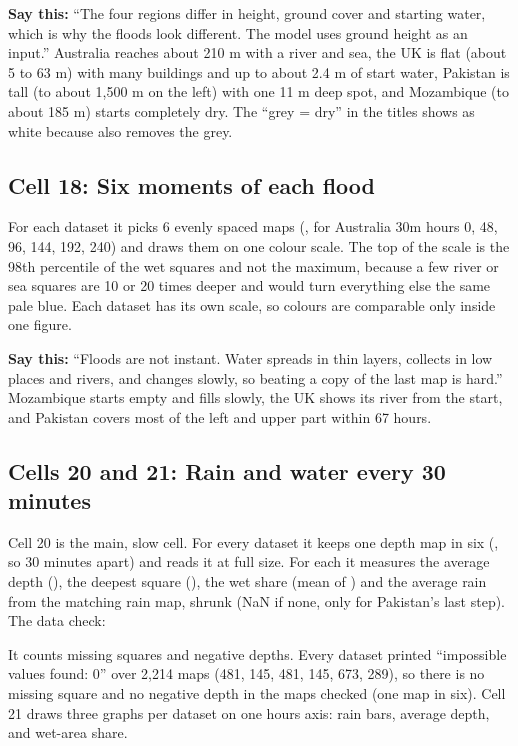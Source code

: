 \textbf{Say this:} ``The four regions differ in height, ground cover and starting water, which is why the floods look different. The model uses ground height as an input.'' Australia reaches about 210 m with a river and sea, the UK is flat (about 5 to 63 m) with many buildings and up to about 2.4 m of start water, Pakistan is tall (to about 1,500 m on the left) with one 11 m deep spot, and Mozambique (to about 185 m) starts completely dry. The ``grey = dry'' in the titles shows as white because  also removes the grey.

\subsection{Cell 18: Six moments of each flood}
For each dataset it picks 6 evenly spaced maps (, for Australia 30m hours 0, 48, 96, 144, 192, 240) and draws them on one colour scale. The top of the scale is the 98th percentile of the wet squares and not the maximum, because a few river or sea squares are 10 or 20 times deeper and would turn everything else the same pale blue. Each dataset has its own scale, so colours are comparable only inside one figure.

\textbf{Say this:} ``Floods are not instant. Water spreads in thin layers, collects in low places and rivers, and changes slowly, so beating a copy of the last map is hard.'' Mozambique starts empty and fills slowly, the UK shows its river from the start, and Pakistan covers most of the left and upper part within 67 hours.

\subsection{Cells 20 and 21: Rain and water every 30 minutes}
Cell 20 is the main, slow cell. For every dataset it keeps one depth map in six (\cd{[::6]}, so 30 minutes apart) and reads it at full size. For each it measures the average depth (), the deepest square (), the wet share (mean of ) and the average rain from the matching rain map, shrunk (NaN if none, only for Pakistan's last step). The data check:

It counts missing squares and negative depths. Every dataset printed ``impossible values found: 0'' over 2,214 maps (481, 145, 481, 145, 673, 289), so there is no missing square and no negative depth in the maps checked (one map in six). Cell 21 draws three graphs per dataset on one hours axis: rain bars, average depth, and wet-area share.

